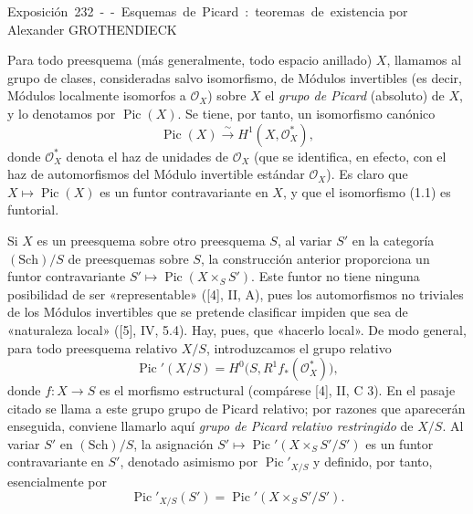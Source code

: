 \unit{Exposición 232 -- Esquemas de Picard: teoremas de existencia}
%
  {por Alexander GROTHENDIECK}


Para todo preesquema (más generalmente, todo espacio anillado) $X$, llamamos al
grupo de clases, consideradas salvo isomorfismo, de Módulos invertibles (es
decir, Módulos localmente isomorfos a $\mathcal O_X$) sobre $X$ el
\emph{grupo de Picard} (absoluto) de $X$, y lo denotamos por
$\operatorname{Pic}(X)$. Se tiene, por tanto, un isomorfismo canónico
\begin{equation}
\operatorname{Pic}(X)\xrightarrow{\sim}H^1(X,\mathcal O_X^*),
\tag{1.1}
\end{equation}
donde $\mathcal O_X^*$ denota el haz de unidades de $\mathcal O_X$ (que se
identifica, en efecto, con el haz de automorfismos del Módulo invertible
estándar $\mathcal O_X$). Es claro que
$X\longmapsto\operatorname{Pic}(X)$ es un funtor contravariante en $X$, y que
el isomorfismo (1.1) es funtorial.

Si $X$ es un preesquema sobre otro preesquema $S$, al variar $S'$ en la
categoría $(\mathrm{Sch})/S$ de preesquemas sobre $S$, la construcción anterior
proporciona un funtor contravariante
$S'\longmapsto\operatorname{Pic}(X\times_SS')$. Este funtor no tiene ninguna
posibilidad de ser «representable» ([4], II, A), pues los automorfismos no
triviales de los Módulos invertibles que se pretende clasificar impiden que sea
de «naturaleza local» ([5], IV, 5.4). Hay, pues, que «hacerlo local». De modo
general, para todo preesquema relativo $X/S$, introduzcamos el grupo relativo
\begin{equation}
\operatorname{Pic}'(X/S)=H^0\bigl(S,R^1f_*(\mathcal O_X^*)\bigr),
\tag{1.2}
\end{equation}
donde $f:X\longrightarrow S$ es el morfismo estructural (compárese [4], II,
C 3). En el pasaje citado se llama a este grupo grupo de Picard relativo; por
razones que aparecerán enseguida, conviene llamarlo aquí \emph{grupo de Picard
relativo restringido} de $X/S$. Al variar $S'$ en $(\mathrm{Sch})/S$, la
asignación $S'\longmapsto\operatorname{Pic}'(X\times_SS'/S')$ es un funtor
contravariante en $S'$, denotado asimismo por $\operatorname{Pic}'_{X/S}$ y
definido, por tanto, esencialmente por
\begin{equation}
\operatorname{Pic}'_{X/S}(S')=
\operatorname{Pic}'(X\times_SS'/S').
\tag{1.3}
\end{equation}

